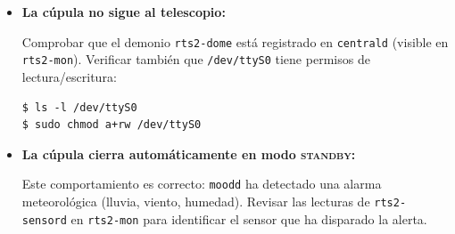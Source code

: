 \documentclass[12pt,a4paper,titlepage]{article}
\begin{document}
\begin{itemize}
  \item \textbf{La cúpula no sigue al telescopio:}

  Comprobar que el demonio \texttt{rts2-dome} está registrado en \texttt{centrald} (visible en \texttt{rts2-mon}). Verificar también que \texttt{/dev/ttyS0} tiene permisos de lectura/escritura:
\begin{verbatim}
$ ls -l /dev/ttyS0
$ sudo chmod a+rw /dev/ttyS0
\end{verbatim}

  \item \textbf{La cúpula cierra automáticamente en modo \textsc{standby}:}

  Este comportamiento es correcto: \texttt{moodd} ha detectado una alarma meteorológica (lluvia, viento, humedad). Revisar las lecturas de \texttt{rts2-sensord} en \texttt{rts2-mon} para identificar el sensor que ha disparado la alerta.

\end{itemize}
\end{document}
